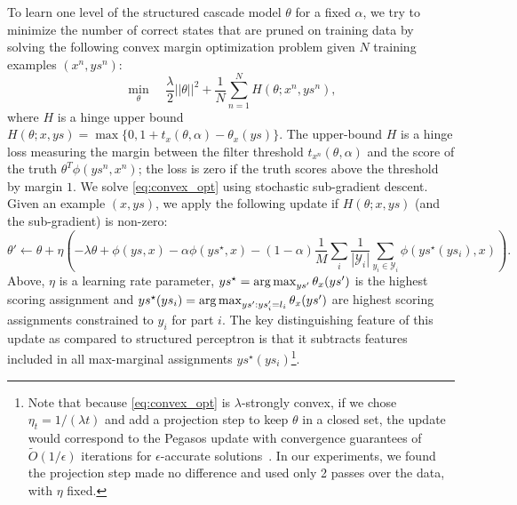 
To learn one level of the structured cascade model $\theta$ for a fixed $\alpha$, we try to minimize 
the number of correct states that are pruned on training data by solving the
following convex margin optimization problem given $N$ training examples $(x^n,ys^n)$:
\begin{equation}
  \label{eq:convex_opt}
 \min_{\theta} \;\;\;\ \frac{\lambda}{2}||\theta||^2 + \frac{1}{N}\sum_{n=1}^N H(\theta;x^n,ys^n),
\end{equation}
where $H$ is a hinge upper bound 
$H(\theta;x,ys) = \max\{0, 1 + t_x(\theta,\alpha) - \theta_x(ys)\}$.
The upper-bound $H$ is a hinge loss measuring the margin between the
filter threshold $t_{x^n}(\theta,\alpha)$ and the score of the truth
$\theta^T\phi(ys^n,x^n)$; the loss is zero if the truth scores above
the threshold by margin $1$.  We solve \eqref{eq:convex_opt} using stochastic
sub-gradient descent. Given an example $(x,ys)$, we apply the following
update if $H(\theta;x,ys)$ (and the sub-gradient) is non-zero:
\begin{equation*}
    \label{eq:spf_update}
    \theta'  \leftarrow \theta + \eta \left(-\lambda \theta + \phi(ys,x) - \alpha \phi(ys^\star,x)  - (1-\alpha) \frac{1}{M} \sum_{i} \frac{1}{|\mathcal{Y}_i|}\sum_{y_i \in \mathcal{Y}_i}  \phi(ys^\star(ys_i),x)\right).
\end{equation*}
Above, $\eta$ is a learning rate parameter, $ys^\star = \mathop{\arg\max}_{ys'}
\theta_x(ys')$ is the highest scoring assignment and $ys^\star(ys_i) = \mathop{\arg\max}_{ys': ys'_i = l_i} \theta_x(ys')$
are highest scoring assignments constrained to $y_i$ for part $i$.
The key distinguishing feature of this update as compared to
structured perceptron is that it subtracts features included in all
max-marginal assignments $ys^\star(ys_i)$\footnote{Note that because \eqref{eq:convex_opt} is $\lambda$-strongly convex,
if we chose $\eta_t = 1/(\lambda t)$ and add a projection step to keep 
$\theta$ in a closed set, the update would correspond to the Pegasos
update with convergence guarantees of $\tilde{O}(1/\epsilon)$ iterations for
$\epsilon$-accurate solutions~\cite{shalev-shwartz07pegasos}.  In our experiments, we found the projection step made no difference and used only 2 passes over the data, with $\eta$ fixed.}.

